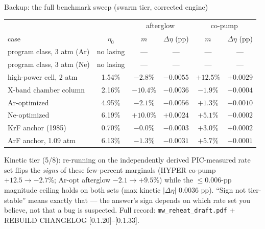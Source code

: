 \documentclass[aspectratio=169,10pt]{beamer}
\begin{document}
\appendix
\begin{frame}{Backup: the full benchmark sweep (swarm tier, corrected engine)}
\begin{center}
\footnotesize
\begin{tabular}{lccccc}
\toprule
 & & \multicolumn{2}{c}{afterglow} & \multicolumn{2}{c}{co-pump} \\
case & $\eta_0$ & $m$ & $\Delta\eta$ (pp) & $m$ & $\Delta\eta$ (pp) \\
\midrule
program class, 3 atm (Ar) & no lasing & --- & --- & --- & --- \\
program class, 3 atm (Ne) & no lasing & --- & --- & --- & --- \\
high-power cell, 2 atm & 1.54\% & $-2.8\%$ & $-0.0055$ & $+12.5\%$ & $+0.0029$ \\
X-band chamber column & 2.16\% & $-10.4\%$ & $-0.0036$ & $-1.9\%$ & $-0.0004$ \\
Ar-optimized & 4.95\% & $-2.1\%$ & $-0.0056$ & $+1.3\%$ & $-0.0010$ \\
Ne-optimized & 6.19\% & $+10.0\%$ & $+0.0024$ & $+5.1\%$ & $-0.0002$ \\
KrF anchor (1985) & 0.70\% & $-0.0\%$ & $-0.0003$ & $+3.0\%$ & $+0.0002$ \\
ArF anchor, 1.09 atm & 6.13\% & $-1.3\%$ & $-0.0031$ & $+5.7\%$ & $-0.0001$ \\
\bottomrule
\end{tabular}
\end{center}
\vspace{0.5ex}
{\small Kinetic tier (5/8): re-running on the independently derived
PIC-measured rate set flips the \emph{signs} of these few-percent
marginals (HYPER co-pump $+12.5\to-2.7\%$; Ar-opt afterglow
$-2.1\to+9.5\%$) while the $\le0.006$-pp magnitude ceiling holds on
both sets (max kinetic $|\Delta\eta|$ 0.0036 pp). ``Sign not
tier-stable'' means exactly that --- the answer's sign depends on
which rate set you believe, not that a bug is suspected. Full record:
\texttt{mw\_reheat\_draft.pdf} + REBUILD CHANGELOG [0.1.20]--[0.1.33].}
\end{frame}
\end{document}
